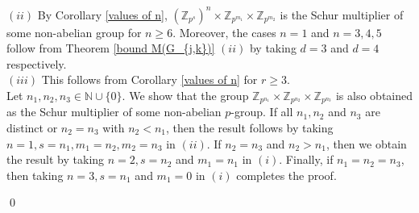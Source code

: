\documentclass[preprint,sort&compress,12pt]{elsarticle}
\newtheorem{remark}[theorem]{Remark}
\numberwithin{equation}{section}
\theoremstyle{definition}
\newcommand{\Z}{\mathbb{Z}}
\begin{document}
   \noindent $(ii)$ By Corollary \ref{values of n}, $(\Z_{p^s})^n \times \Z_{p^{m_1}}\times \Z_{p^{m_2}}$ is the Schur multiplier of some non-abelian group for $n \ge 6$. Moreover, the cases $n=1$ and $n=3,4,5$ follow from Theorem \ref{bound M(G_{j,k})} $(ii)$ by taking $d=3$ and $d=4$ respectively.\\

   \noindent $(iii)$ 
This follows from Corollary \ref{values of n} for $r \geq 3$.\\

Let $n_1,n_2,n_3 \in \mathbb{N} \cup \{0\}$.  We show that the group $\Z_{p^{n_1}} \times \Z_{p^{n_2}} \times \Z_{p^{n_3}}$ is also obtained as the Schur multiplier of some non-abelian $p$-group. 
If all $n_1,n_2$ and $n_3$ are distinct or $n_2=n_3$ with $n_2 < n_1 $, then the result follows by taking $n=1,s=n_1,m_1=n_2,m_2=n_3$ in $(ii)$. If $n_2=n_3$ and $n_2 > n_1$, then  we obtain the result  by taking $n=2,s=n_2$ and $m_1=n_1$ in $(i)$. Finally, if $n_1=n_2=n_3$, then taking $n=3,s=n_1$ and $m_1=0$ in $(i)$ completes the proof.

\qed

\end{document}
